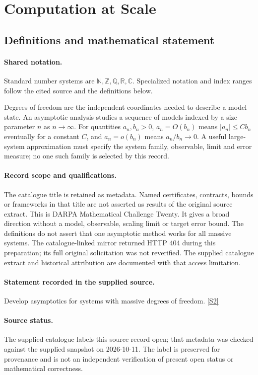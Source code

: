 \documentclass[11pt]{article}
\newcommand{\sref}[2]{\hyperlink{source:#1:#2}{[S#2]}}
\begin{document}
\section{Computation at Scale}\label{statement}

\subsection{Definitions and mathematical statement}

\paragraph{Shared notation.}Standard number systems are $\mathbb N,\mathbb Z,\mathbb Q,\mathbb R,\mathbb C$. Specialized notation and index ranges follow the cited source and the definitions below.


Degrees of freedom are the independent coordinates needed to describe a model state. An asymptotic analysis studies a sequence of models indexed by a size parameter $n$ as $n\to\infty$. For quantities $a_n,b_n>0$, $a_n=O(b_n)$ means $|a_n|\leq Cb_n$ eventually for a constant $C$, and $a_n=o(b_n)$ means $a_n/b_n\to0$. A useful large-system approximation must specify the system family, observable, limit and error measure; no one such family is selected by this record.
\paragraph{Record scope and qualifications.}
The catalogue title is retained as metadata. Named certificates, contracts, bounds or frameworks in that title are not asserted as results of the original source extract.
This is DARPA Mathematical Challenge Twenty. It gives a broad direction without a model, observable, scaling limit or target error bound. The definitions do not assert that one asymptotic method works for all massive systems. The catalogue-linked mirror returned HTTP 404 during this preparation; its full original solicitation was not reverified. The supplied catalogue extract and historical attribution are documented with that access limitation.
\paragraph{Statement recorded in the supplied source.}
Develop asymptotics for systems with massive degrees of freedom. \sref{statement}{2}
\paragraph{Source status.}
The supplied catalogue labels this source record open; that metadata was checked against the supplied snapshot on 2026-10-11. The label is preserved for provenance and is not an independent verification of present open status or mathematical correctness.
\end{document}
